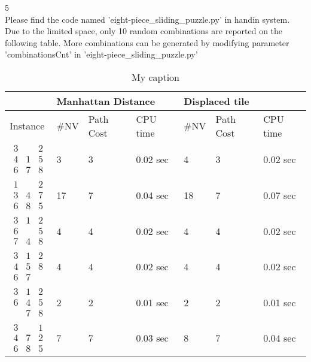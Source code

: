 \documentclass[a4paper]{article}
\begin{document}
5\\
Please find the code named 'eight-piece\_sliding\_puzzle.py' in handin system.\\
Due to the limited space, only 10 random combinations are reported on the following table. More combinations can be generated by modifying parameter 'combinationsCnt' in 'eight-piece\_sliding\_puzzle.py'\\

\begin{table}[]
\centering
\caption{My caption}
\label{my-label}
\begin{tabular}{|l|l|l|l|l|l|l|}
\hline
 & \multicolumn{3}{l|}{Manhattan Distance} & \multicolumn{3}{l|}{Displaced tile} \\ \hline
 Instance &   \#NV    &  Path Cost     &   CPU time   &  \#NV    &   Path Cost   &    CPU time     \\ \hline
$\begin{matrix} 3 &   & 2 \\ 4 & 1 & 5 \\ 6 & 7 & 8 \end{matrix}$ & 3 & 3 & 0.02 sec & 4 & 3 & 0.02 sec \\ \hline
 $\begin{matrix} 1 &   & 2 \\ 3 & 4 & 7 \\ 6 & 8 & 5 \end{matrix}$ & 17 & 7 & 0.04 sec & 18 & 7 & 0.07 sec \\ \hline
 $\begin{matrix} 3 & 1 & 2 \\ 6 &   & 5 \\ 7 & 4 & 8 \end{matrix}$ & 4 & 4 & 0.02 sec & 4 & 4 & 0.02 sec \\ \hline
$\begin{matrix} 3 & 1 & 2 \\ 4 & 5 & 8 \\ 6 & 7 &   \end{matrix}$ & 4 & 4 & 0.02 sec & 4 & 4 & 0.02 sec \\ \hline
 $\begin{matrix} 3 & 1 & 2 \\ 6 & 4 & 5 \\   & 7 & 8 \end{matrix}$ & 2 & 2 & 0.01 sec & 2 & 2 & 0.01 sec \\ \hline
 $\begin{matrix} 3 &   & 1 \\ 4 & 7 & 2 \\ 6 & 8 & 5 \end{matrix}$ & 7 & 7 & 0.03 sec & 8 & 7 & 0.04 sec \\ \hline

\end{tabular}
\end{table}
\end{document}

